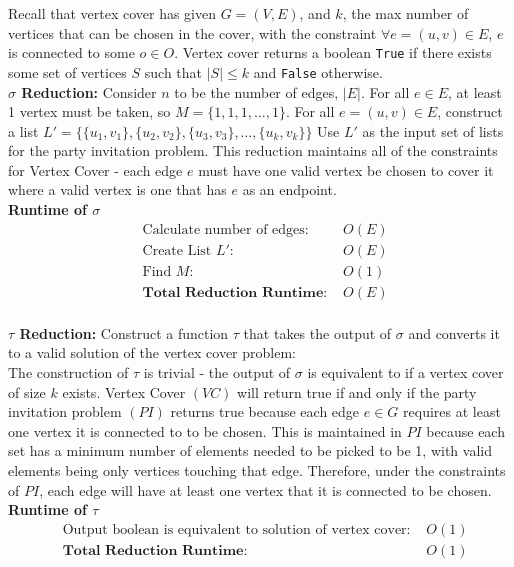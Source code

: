 \documentclass[11pt]{article}
\begin{document}
Recall that vertex cover has given $G = (V,E)$, and $k$, the max number of vertices that can be chosen in the cover, with the constraint $\forall e = (u,v) \in E$, $e$ is connected to some $o \in O$. Vertex cover returns a boolean \texttt{True} if there exists some set of vertices $S$ such that $|S| \leq k $ and \texttt{False} otherwise. \\

\textbf{$\sigma$ Reduction:}
Consider $n$ to be the number of edges, $|E|$. For all $e \in E$, at least 1 vertex must be taken, so $M = \{1,1,1,\ldots, 1\}$. For all $e = (u,v) \in E$, construct a list $L' = \{\{u_1,v_1\},\{u_2,v_2\},\{u_3,v_3\},\ldots, \{u_k,v_k\}\}$ Use $L'$ as the input set of lists for the party invitation problem. This reduction maintains all of the constraints for Vertex Cover -  each edge $e$ must have one valid vertex be chosen to cover it where a valid vertex is one that has $e$ as an endpoint. \\

\textbf{Runtime of $\sigma$}
\begin{align*}
&\text{Calculate number of edges: } &O(E)\\ 
&\text{Create List $L'$: } &O(E)\\ 
&\text{Find $M$: } &O(1)\\
&\textbf{Total Reduction Runtime: } &O(E)\\
\end{align*}

\textbf{$\tau$ Reduction:}
Construct a function $\tau$ that takes the output of $\sigma$ and converts it to a valid solution of the vertex cover problem:\\

The construction of $\tau$ is trivial - the output of $\sigma$ is equivalent to if a vertex cover of size $k$ exists. Vertex Cover $(VC)$  will return true if and only if the party invitation problem $(PI)$ returns true because each edge $e \in G$ requires at least one vertex it is connected to to be chosen. This is maintained in $PI$ because each set has a minimum number of elements needed to be picked to be 1, with valid elements being only vertices touching that edge. Therefore, under the constraints of $PI$, each edge will have at least one vertex that it is connected to be chosen. \lobtomb \\

\textbf{Runtime of $\tau$ }
\begin{align*}
&\text{Output boolean is equivalent to solution of vertex cover: } &O(1)\\ 
&\textbf{Total Reduction Runtime: } &O(1)\\
\end{align*}
\end{document}
